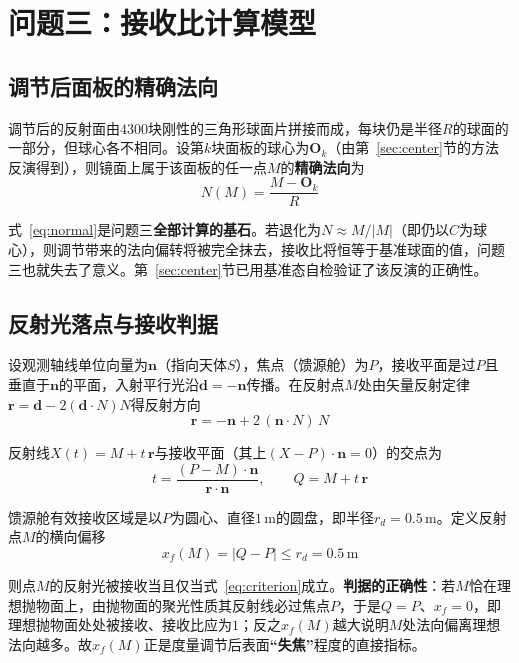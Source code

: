 \documentclass[withoutpreface]{cumcmthesis}
\begin{document}
\section{问题三：接收比计算模型}

\subsection{调节后面板的精确法向}

调节后的反射面由$4300$块刚性的三角形球面片拼接而成，每块仍是半径$R$的球面的一部分，但球心各不相同。设第$k$块面板的球心为$\mathbf{O}_k$（由第~\ref{sec:center}节的方法反演得到），则镜面上属于该面板的任一点$M$的\textbf{精确法向}为
\begin{equation}\label{eq:normal}
N(M)=\frac{M-\mathbf{O}_k}{R}
\end{equation}

式~\eqref{eq:normal}是问题三\textbf{全部计算的基石}。若退化为$N\approx M/|M|$（即仍以$C$为球心），则调节带来的法向偏转将被完全抹去，接收比将恒等于基准球面的值，问题三也就失去了意义。第~\ref{sec:center}节已用基准态自检验证了该反演的正确性。

\subsection{反射光落点与接收判据}

设观测轴线单位向量为$\mathbf{n}$（指向天体$S$），焦点（馈源舱）为$P$，接收平面是过$P$且垂直于$\mathbf{n}$的平面，入射平行光沿$\mathbf{d}=-\mathbf{n}$传播。在反射点$M$处由矢量反射定律$\mathbf{r}=\mathbf{d}-2(\mathbf{d}\cdot N)N$得反射方向
\begin{equation}\label{eq:reflect}
\mathbf{r}=-\mathbf{n}+2\,(\mathbf{n}\cdot N)\,N
\end{equation}

反射线$X(t)=M+t\,\mathbf{r}$与接收平面（其上$(X-P)\cdot\mathbf{n}=0$）的交点为
\begin{equation}\label{eq:hit}
t=\frac{(P-M)\cdot\mathbf{n}}{\mathbf{r}\cdot\mathbf{n}},\qquad Q=M+t\,\mathbf{r}
\end{equation}

馈源舱有效接收区域是以$P$为圆心、直径$1\,\mathrm{m}$的圆盘，即半径$r_d=0.5\,\mathrm{m}$。定义反射点$M$的横向偏移
\begin{equation}\label{eq:criterion}
x_f(M)=|Q-P|\le r_d=0.5\,\mathrm{m}
\end{equation}

则点$M$的反射光被接收当且仅当式~\eqref{eq:criterion}成立。\textbf{判据的正确性}：若$M$恰在理想抛物面上，由抛物面的聚光性质其反射线必过焦点$P$，于是$Q=P$、$x_f=0$，即理想抛物面处处被接收、接收比应为$1$；反之$x_f(M)$越大说明$M$处法向偏离理想法向越多。故$x_f(M)$正是度量调节后表面\textbf{``失焦''}程度的直接指标。
\end{document}

